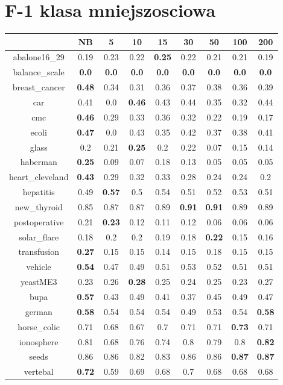 \documentclass{article}%
\begin{document}
%
\section*{F{-}1 klasa mniejszosciowa}%
\begin{tabular}{c|cccccccc}%
\hline%
&NB&5&10&15&30&50&100&200\\%
\hline%
abalone16\_29&0.19&0.23&0.22&\textbf{0.25}&0.22&0.21&0.21&0.19\\%
\hline%
balance\_scale&\textbf{0.0}&\textbf{0.0}&\textbf{0.0}&\textbf{0.0}&\textbf{0.0}&\textbf{0.0}&\textbf{0.0}&\textbf{0.0}\\%
\hline%
breast\_cancer&\textbf{0.48}&0.34&0.31&0.36&0.37&0.38&0.36&0.39\\%
\hline%
car&0.41&0.0&\textbf{0.46}&0.43&0.44&0.35&0.32&0.44\\%
\hline%
cmc&\textbf{0.46}&0.29&0.33&0.36&0.32&0.22&0.19&0.17\\%
\hline%
ecoli&\textbf{0.47}&0.0&0.43&0.35&0.42&0.37&0.38&0.41\\%
\hline%
glass&0.2&0.21&\textbf{0.25}&0.2&0.22&0.07&0.15&0.14\\%
\hline%
haberman&\textbf{0.25}&0.09&0.07&0.18&0.13&0.05&0.05&0.05\\%
\hline%
heart\_cleveland&\textbf{0.43}&0.29&0.32&0.33&0.28&0.24&0.24&0.2\\%
\hline%
hepatitis&0.49&\textbf{0.57}&0.5&0.54&0.51&0.52&0.53&0.51\\%
\hline%
new\_thyroid&0.85&0.87&0.87&0.89&\textbf{0.91}&\textbf{0.91}&0.89&0.89\\%
\hline%
postoperative&0.21&\textbf{0.23}&0.12&0.11&0.12&0.06&0.06&0.06\\%
\hline%
solar\_flare&0.18&0.2&0.2&0.19&0.18&\textbf{0.22}&0.15&0.16\\%
\hline%
transfusion&\textbf{0.27}&0.15&0.15&0.14&0.15&0.18&0.15&0.15\\%
\hline%
vehicle&\textbf{0.54}&0.47&0.49&0.51&0.53&0.52&0.51&0.51\\%
\hline%
yeastME3&0.23&0.26&\textbf{0.28}&0.25&0.24&0.25&0.23&0.27\\%
\hline%
bupa&\textbf{0.57}&0.43&0.49&0.41&0.37&0.45&0.49&0.47\\%
\hline%
german&\textbf{0.58}&0.54&0.54&0.54&0.49&0.53&0.54&\textbf{0.58}\\%
\hline%
horse\_colic&0.71&0.68&0.67&0.7&0.71&0.71&\textbf{0.73}&0.71\\%
\hline%
ionosphere&0.81&0.68&0.76&0.74&0.8&0.79&0.8&\textbf{0.82}\\%
\hline%
seeds&0.86&0.86&0.82&0.83&0.86&0.86&\textbf{0.87}&\textbf{0.87}\\%
\hline%
vertebal&\textbf{0.72}&0.59&0.69&0.68&0.7&0.68&0.68&0.68\\%
\hline%
\end{tabular}
\end{document}
